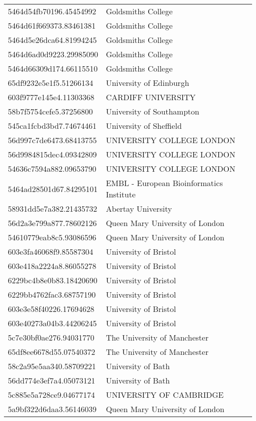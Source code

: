 \begin{tabular}{ll}
5464d54fb70196.45454992 & Goldsmiths College \\
5464d61f669373.83461381 & Goldsmiths College \\
5464d5e26dca64.81994245 & Goldsmiths College \\
5464d6ad0d9223.29985090 & Goldsmiths College \\
5464d66309d174.66115510 & Goldsmiths College \\
65df9232e5e1f5.51266134 & University of Edinburgh \\
603f9777e145e4.11303368 & CARDIFF UNIVERSITY \\
58b7f5754cefe5.37256800 & University of Southampton \\
545ca1fcbd3bd7.74674461 & University of Sheffield \\
56d997c7de6473.68413755 & UNIVERSITY COLLEGE LONDON \\
56d9984815dec4.09342809 & UNIVERSITY COLLEGE LONDON \\
54636c7594a882.09653790 & UNIVERSITY COLLEGE LONDON \\
5464ad28501d67.84295101 & EMBL - European Bioinformatics Institute \\
58931dd5e7a382.21435732 & Abertay University \\
56d2a3e799a877.78602126 & Queen Mary University of London \\
54610779eab8c5.93086596 & Queen Mary University of London \\
603e3fa46068f9.85587304 & University of Bristol \\
603e418a2224a8.86055278 & University of Bristol \\
6229bc4b8e0b83.18420690 & University of Bristol \\
6229bb4762fac3.68757190 & University of Bristol \\
603e3e58f40226.17694628 & University of Bristol \\
603e40273a04b3.44206245 & University of Bristol \\
5c7e30bf0ae276.94031770 & The University of Manchester \\
65df8ee6678d55.07540372 & The University of Manchester \\
58c2a95e5aa340.58709221 & University of Bath \\
56dd774e3ef7a4.05073121 & University of Bath \\
5c885e5a728ce9.04677174 & UNIVERSITY OF CAMBRIDGE \\
5a9bf322d6daa3.56146039 & Queen Mary University of London \\

\end{tabular}
